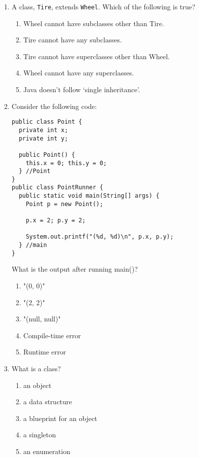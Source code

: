 \documentclass[S17-Final.tex]{subfiles}
\begin{document}
\begin{enumerate}
\item A class, \texttt{Tire}, extends \texttt{Wheel}. Which of the following is true?

\begin{enumerate}
\item  Wheel cannot have subclasses other than Tire.
\item  Tire cannot have any subclasses.
\item  Tire cannot have superclasses other than Wheel.
\item  Wheel cannot have any superclasses.
\item  Java doesn’t follow ‘single inheritance’.
\end{enumerate}

\clearpage 

\item Consider the following code:
\begin{lstlisting}
public class Point {
  private int x;
  private int y;

  public Point() {
    this.x = 0; this.y = 0;
  } //Point
}
public class PointRunner {
  public static void main(String[] args) {
    Point p = new Point();

    p.x = 2; p.y = 2;

    System.out.printf("(%d, %d)\n", p.x, p.y);
  } //main
}
\end{lstlisting}

What is the output after running main()?

\begin{enumerate}
\item  "(0, 0)"
\item  "(2, 2)"
\item  "(null, null)"
\item  Compile-time error
\item  Runtime error
\end{enumerate}

\item What is a class?

\begin{enumerate}
\item  an object
\item  a data structure
\item  a blueprint for an object
\item  a singleton
\item  an enumeration
\end{enumerate}


\end{enumerate}
\end{document}
